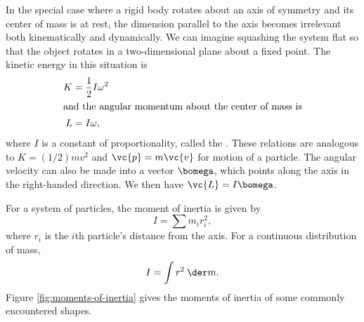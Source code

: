 \timetraveltohere

In the special case where a rigid body rotates about an axis of symmetry and its
center of mass is at rest, the dimension parallel to the axis becomes irrelevant
both kinematically and dynamically. We can imagine squashing the system flat
so that the object rotates in a two-dimensional plane about a fixed point.
The kinetic energy in this situation is
\begin{align*}
  K &= \frac{1}{2}I\omega^2 \\
\intertext{and the angular momentum about the center of mass is}
  L &= I\omega,
\end{align*}
where $I$ is a constant of proportionality, called the .
These relations are analogous to $K=(1/2)mv^2$ and $\vc{p}=m\vc{v}$ for motion of
a particle.
The angular velocity can also be made into a vector $\bomega$, which points along
the axis in the right-handed direction. We then have $\vc{L}=I\bomega$.

For a system of particles, the moment of inertia is given by
\begin{equation*}
  I = \sum m_i r_i^2,
\end{equation*}
where $r_i$ is the $i$th particle's distance from the axis. For a continuous distribution
of mass,
\begin{equation*}
  I = \int r^2 \:\der m.
\end{equation*}
Figure \ref{fig:moments-of-inertia} gives the moments of inertia of some commonly encountered
shapes.

